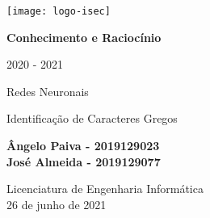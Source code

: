 \begin{titlepage}
	\begin{center}
		\texttt{[image: logo-isec]}
		
		\vspace*{\fill}
		
		\Huge
		\textbf{Conhecimento e Raciocínio}
		
		\LARGE
		2020 - 2021
		
		\vspace{1.5cm}
		
		\huge
		Redes Neuronais
		
		\LARGE
		Identificação de Caracteres Gregos
		
		\vspace{2.5cm}
		
		\textbf{Ângelo Paiva - 2019129023} \\
		\textbf{José Almeida - 2019129077}
		
		
		\vfill
		\vspace*{\fill}
		
		\normalsize
		Licenciatura de Engenharia Informática \\
		26 de junho de 2021		
	\end{center}
\end{titlepage}